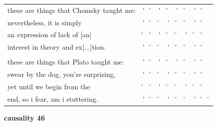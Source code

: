 \documentclass[12pt, landscape]{article}
\begin{document}
\begin{center}
\begin{tabularx}{\textwidth}{
>{\lefting\arraybackslash}X
c
c
c
c
c
c
c
c
c
}

these are things that Chomsky taught me: & \'{} & \u{} & \'{} & \u{} & \'{} & \u{} & \'{} & \u{} & \\
nevertheless, it is simply & \'{} & \u{} & \u{} & \'{} & \u{} & \u{} & \'{} & \u{} & \\
an expression of lack of [an] & \u{} & \u{} & \'{} & \u{} & \u{} & \'{} & \u{} & \u{} & \\
interest in theory and ex[...]tion. & \'{} & \u{} & \u{} & \'{} & \u{} & \u{} & \'{} & \u{} & \\
 & & & & & & & & \\
these are things that Plato taught me: & \'{} & \u{} & \'{} & \u{} & \'{} & \u{} & \'{} & \u{} & \\
swear by the dog, you're surprising, & \'{} & \u{} & \u{} & \'{} & \u{} & \u{} & \'{} & \u{} & \\
yet until we begin from the & \u{} & \u{} & \'{} & \u{} & \u{} & \'{} & \u{} & \u{} & \\
end, so i fear, am i stuttering.  & \'{} & \u{} & \u{} & \'{} & \u{} & \u{} & \'{} & \u{} & \u{} \\

\end{tabularx}
\end{center}

\vspace*{\fill}

\newpage

\vspace*{\fill}

\noindent \textbf{causality 46}
\noindent \hfill \par
\end{document}
